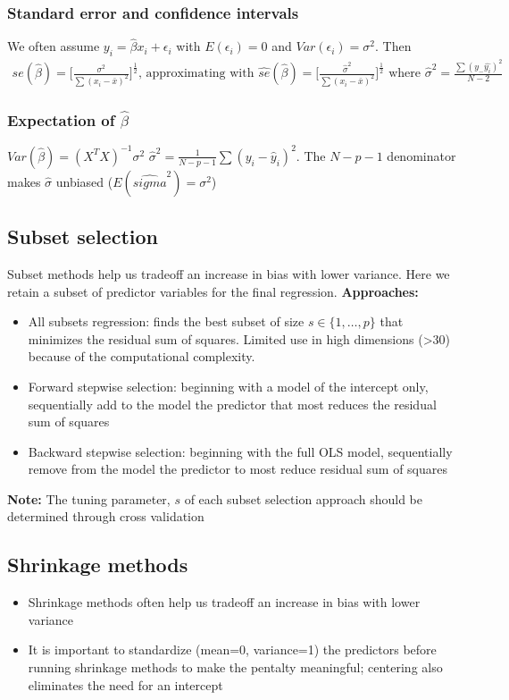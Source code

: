 \documentclass{article}
\begin{document}
\subsubsection{Standard error and confidence intervals}
We often assume $y_i = \hat{\beta}x_i + \epsilon_i$ with $E(\epsilon_i) = 0$ and $Var(\epsilon_i) = \sigma^2$. Then
\begin{align*}
  se(\hat{\beta}) = \biggl[ \frac{\sigma^2}{\sum(x_i - \bar{x})^2}\biggr]^{\frac{1}{2}} \textrm{, approximating with } \hat{se}(\hat{\beta}) = \biggl[ \frac{\hat{\sigma}^2}{\sum(x_i - \bar{x})^2}\biggr]^{\frac{1}{2}} \textrm{ where } \hat{\sigma}^2 = \frac{\sum(y_ - \hat{y_i})^2}{N-2}
\end{align*}

\subsubsection{Expectation of $\hat{\beta}$}
$Var(\hat{\beta}) = (X^TX)^{-1}\sigma^2$
$\hat{\sigma}^2 = \frac{1}{N - p - 1}\sum(y_i - \hat{y}_i)^2$. The $N-p-1$ denominator makes $\hat{\sigma}$ unbiased ($E(\hat{sigma}^2) = \sigma^2$)

\subsection{Subset selection}
Subset methods help us tradeoff an increase in bias with lower variance. Here we retain a subset of predictor variables for the final regression.
\textbf{Approaches:}
\begin{itemize}
  \item All subsets regression: finds the best subset of size $s \in \{1, \dots, p\}$ that minimizes the residual sum of squares. Limited use in high dimensions (>30) because of the computational complexity. 
  \item Forward stepwise selection: beginning with a model of the intercept only, sequentially add to the model the predictor that most reduces the residual sum of squares
  \item Backward stepwise selection: beginning with the full OLS model, sequentially remove from the model the predictor to most reduce residual sum of squares
\end{itemize}
\textbf{Note:} The tuning parameter, $s$ of each subset selection approach should be determined through cross validation

\subsection{Shrinkage methods}
\begin{itemize}
  \item Shrinkage methods often help us tradeoff an increase in bias with lower variance
  \item It is important to standardize (mean=0, variance=1) the predictors before running shrinkage methods to make the pentalty meaningful; centering also eliminates the need for an intercept
\end{itemize}
\end{document}
